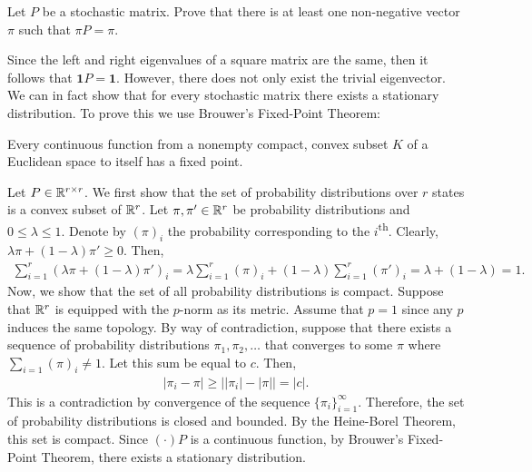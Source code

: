 \begin{problem}{1}
    Let $P$ be a stochastic matrix. Prove that there is at least one non-negative vector $\pi$ such that $\pi P = \pi$. 
\end{problem}
\begin{solution}
    Since the left and right eigenvalues of a square matrix are the same, then it follows that $\mathbf{1}P = \mathbf{1}$. However, there does not only exist the trivial eigenvector. We can in fact show that for every stochastic matrix there exists a stationary distribution. To prove this we use Brouwer's Fixed-Point Theorem:
    \begin{theorem}
        Every continuous function from a nonempty compact, convex subset $K$ of a Euclidean space to itself has a fixed point.
    \end{theorem}
    Let $P \in \mathbb{R}^{r\times r}$. We first show that the set of probability distributions over $r$ states is a convex subset of $\mathbb{R}^r$. Let $\pi, \pi' \in \mathbb{R}^r$ be probability distributions and $0 \leq \lambda \leq 1$. Denote by $(\pi)_i$ the probability corresponding to the $i$\textsuperscript{th}. Clearly, $\lambda \pi + (1-\lambda) \pi' \geq 0$.
    Then, 
    \begin{align*}
        \sum_{i=1}^r \left(\lambda\pi + (1-\lambda)\pi'\right)_i = \lambda \sum_{i=1}^r (\pi)_i + (1-\lambda)\sum_{i=1}^r (\pi')_i = \lambda + (1-\lambda) = 1.
    \end{align*}
    Now, we show that the set of all probability distributions is compact. Suppose that $\mathbb{R}^r$ is equipped with the $p$-norm as its metric. Assume that $p=1$ since any $p$ induces the same topology. By way of contradiction, suppose that there exists a sequence of probability distributions $\pi_1,\pi_2,\ldots$ that converges to some $\pi$ where $\sum_{i=1} (\pi)_i \neq 1$. Let this sum be equal to $c$. Then, 
    \begin{align*}
        |\pi_i - \pi| \geq \left||\pi_i| - |\pi|\right| = |c|.
    \end{align*}
    This is a contradiction by convergence of the sequence $\{\pi_i\}_{i=1}^\infty$. Therefore, the set of probability distributions is closed and bounded. By the Heine-Borel Theorem, this set is compact. Since $(\cdot)P$ is a continuous function, by Brouwer's Fixed-Point Theorem, there exists a stationary distribution.
\end{solution}

